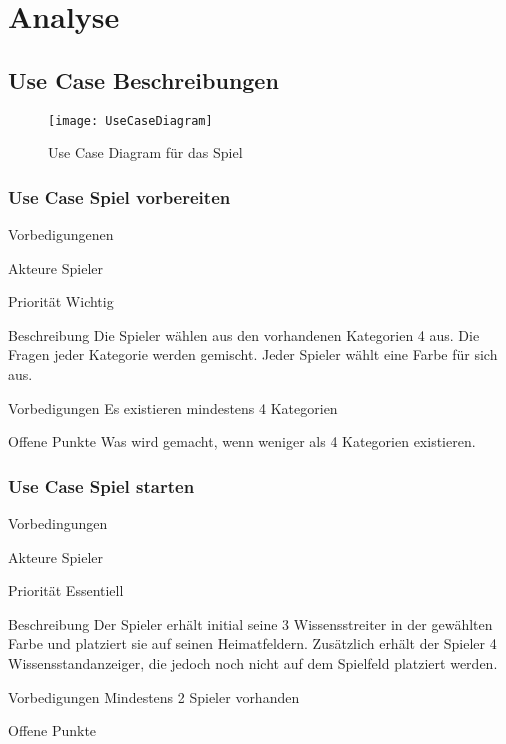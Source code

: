 \chapter{Analyse}\label{chap:Analyse}

\section{Use Case Beschreibungen}
\begin{figure}[h]
  \begin{center}
    \texttt{[image: UseCaseDiagram]}
    \caption{Use Case Diagram für das Spiel}
  \end{center}
\end{figure}

\subsection{Use Case Spiel vorbereiten}
\begin{labeling}[:]{Vorbedigungenen}
\item [Akteure] Spieler
\item [Priorität] Wichtig
\item [Beschreibung] Die Spieler wählen aus den vorhandenen Kategorien 4 aus. Die Fragen jeder Kategorie werden gemischt. Jeder Spieler wählt eine Farbe für sich aus.
\item [Vorbedigungen] Es existieren mindestens 4 Kategorien
\item [Offene Punkte] Was wird gemacht, wenn weniger als 4 Kategorien existieren.
\end{labeling}

\subsection{Use Case Spiel starten}
\begin{labeling}[:]{Vorbedingungen}
\item [Akteure] Spieler
\item [Priorität] Essentiell
\item [Beschreibung] Der Spieler erhält initial seine 3 Wissensstreiter in der gewählten Farbe und platziert sie auf seinen Heimatfeldern. Zusätzlich erhält der Spieler 4 Wissensstandanzeiger, die jedoch noch nicht auf dem Spielfeld platziert werden.
\item [Vorbedigungen] Mindestens 2 Spieler vorhanden
\item [Offene Punkte]
\end{labeling}

